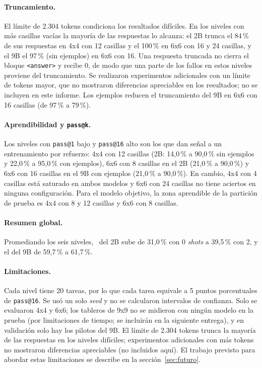 \paragraph{Truncamiento.}
El límite de 2.304 tokens condiciona los resultados difíciles. En los niveles
con más casillas vacías la mayoría de las respuestas lo alcanza: el 2B
trunca el 84\,\% de sus respuestas en 4x4 con 12 casillas y el 100\,\% en
6x6 con 16 y 24 casillas, y el 9B el 97\,\% (sin ejemplos) en 6x6 con 16.
Una respuesta truncada no cierra el bloque \texttt{<answer>} y recibe 0, de
modo que una parte de los fallos en estos niveles proviene del truncamiento.
Se realizaron experimentos adicionales con un límite de tokens mayor, que no
mostraron diferencias apreciables en los resultados; no se incluyen en este
informe. Los ejemplos reducen el
truncamiento del 9B en 6x6 con 16 casillas (de 97\,\% a 79\,\%).

\paragraph{Aprendibilidad y \texttt{pass@k}.}
Los niveles con \texttt{pass@1} bajo y \texttt{pass@16} alto son los que
dan señal a un entrenamiento por refuerzo: 4x4 con 12 casillas (2B: 14,0\,\%
a 90,0\,\% sin ejemplos y 22,0\,\% a 95,0\,\% con ejemplos), 6x6 con 8
casillas en el 2B (21,0\,\% a 90,0\,\%) y 6x6 con 16 casillas en el 9B con
ejemplos (21,0\,\% a 90,0\,\%). En cambio, 4x4 con 4 casillas está saturado en
ambos modelos y 6x6 con 24 casillas no tiene aciertos en ninguna
configuración. Para el modelo objetivo, la zona aprendible de la partición
de prueba es 4x4 con 8 y 12 casillas y 6x6 con 8 casillas.

\paragraph{Resumen global.}
Promediando los seis niveles, \passuno\ del 2B sube de 31,0\,\% con 0
\emph{shots} a 39,5\,\% con 2, y el del 9B de 59,7\,\% a 61,7\,\%.

\paragraph{Limitaciones.}
Cada nivel tiene 20 tareas, por lo que cada tarea equivale a 5 puntos
porcentuales de \texttt{pass@16}. Se usó un solo \emph{seed} y no se calcularon
intervalos de confianza. Solo se evaluaron 4x4 y 6x6; los tableros de 9x9 no
se midieron con ningún modelo en la prueba (por limitaciones de tiempo; se
incluirán en la siguiente entrega), y en validación solo hay los pilotos del 9B.
El límite de 2.304 tokens trunca la mayoría de las respuestas en los niveles
difíciles; experimentos adicionales con más tokens no mostraron diferencias
apreciables (no incluidos aquí). El trabajo previsto para abordar estas
limitaciones se describe en la sección~\ref{sec:futuro}.
